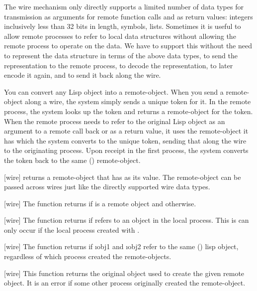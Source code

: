 {The wire mechanism only directly supports a limited number of data
types for transmission as arguments for remote function calls and as
return values: integers inclusively less than 32 bits in length,
symbols, lists.  Sometimes it is useful to allow remote processes to
refer to local data structures without allowing the remote process
to operate on the data.  We have  to support
this without the need to represent the data structure in terms of
the above data types, to send the representation to the remote
process, to decode the representation, to later encode it again, and
to send it back along the wire.

You can convert any Lisp object into a remote-object.  When you send
a remote-object along a wire, the system simply sends a unique token
for it.  In the remote process, the system looks up the token and
returns a remote-object for the token.  When the remote process
needs to refer to the original Lisp object as an argument to a
remote call back or as a return value, it uses the remote-object it
has which the system converts to the unique token, sending that
along the wire to the originating process.  Upon receipt in the
first process, the system converts the token back to the same
() remote-object.

[wire]{}
 returns a remote-object that has  as its
value.  The remote-object can be passed across wires just like the directly
supported wire data types.
\enddefun

[wire]{}
The function  returns \true{} if 
is a remote object and \nil{} otherwise.
\enddefun

[wire]{}
The
function  returns \true{} if
 refers to an object in the local process.  This is can
only occur if the local process created  with
.
\enddefun

[wire]{}
The function  returns \true{} if \i{obj1} and
\i{obj2} refer to the same () lisp object, regardless of
which process created the remote-objects.
\enddefun

[wire]{}
This function returns the original object used to create the given remote
object.  It is an error if some other process originally created the
remote-object.
\enddefun

}
